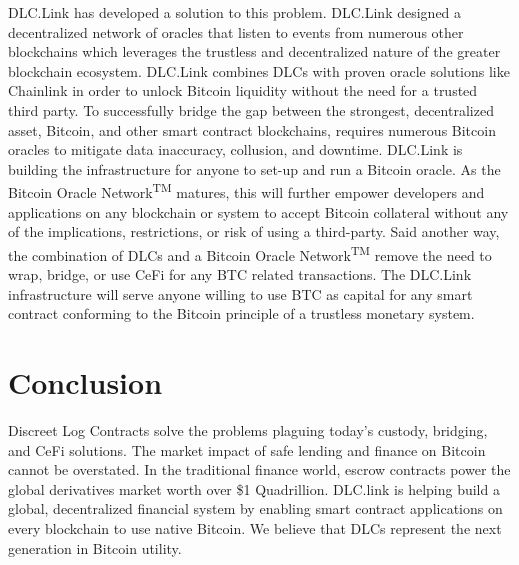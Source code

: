\documentclass[twoside, a4paper, 11pt]{article}
\begin{document}
  DLC.Link has developed a solution to this problem. DLC.Link designed a decentralized network of oracles that listen to events from numerous other blockchains which leverages the trustless and decentralized nature of the greater blockchain ecosystem. DLC.Link combines DLCs with proven oracle solutions like Chainlink in order to unlock Bitcoin liquidity without the need for a trusted third party. To successfully bridge the gap between the strongest, decentralized asset, Bitcoin, and other smart contract blockchains, requires numerous Bitcoin oracles to mitigate data inaccuracy, collusion, and downtime. DLC.Link is building the infrastructure for anyone to set-up and run a Bitcoin oracle. As the Bitcoin Oracle Network\textsuperscript{TM} matures, this will further empower developers and applications on any blockchain or system to accept Bitcoin collateral without any of the implications, restrictions, or risk of using a third-party. Said another way, the combination of DLCs and a Bitcoin Oracle Network\textsuperscript{TM} remove the need to wrap, bridge, or use CeFi for any BTC related transactions. The DLC.Link infrastructure will serve anyone willing to use BTC as capital for any smart contract conforming to the Bitcoin principle of a trustless monetary system.

  \section{Conclusion}

  Discreet Log Contracts solve the problems plaguing today’s custody, bridging, and CeFi solutions. The market impact of safe lending and finance on Bitcoin cannot be overstated. In the traditional finance world, escrow contracts power the global derivatives market worth over \$1 Quadrillion. DLC.link is helping build a global, decentralized financial system by enabling smart contract applications on every blockchain to use native Bitcoin. We believe that DLCs represent the next generation in Bitcoin utility.
\end{document}

